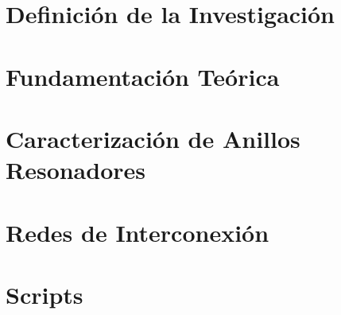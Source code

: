 
\makeindex



    
%    
    

    \tableofcontents
    \listoffigures
    \listoftables
    \lstlistoflistings    

    \chapter{Definición de la Investigación}
        
 
    \chapter{Fundamentación Teórica}
    \label{ch:intro}
    
    
    
    
    \chapter{Caracterización de Anillos Resonadores}
    \label{ch:rr}

    
    
    

    \chapter{Redes de Interconexión}
    
    


    \appendix
    \chapter{Scripts}
    \label{ch:rr_scripts}
    

    
    


